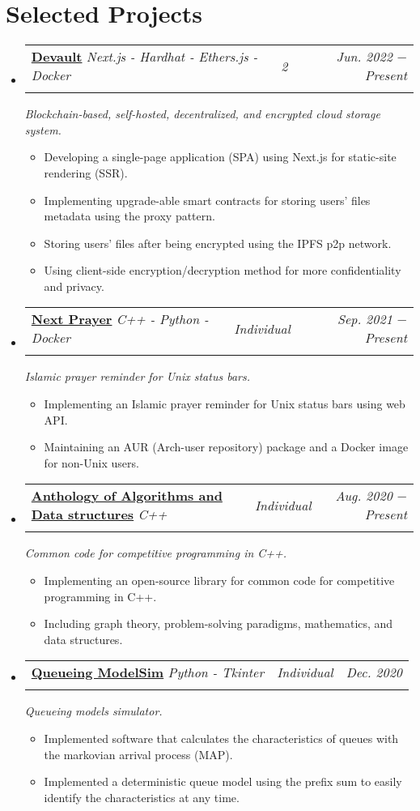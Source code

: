 \documentclass[letterpaper, 11pt]{article}
\makeatletter
\newcommand{\project}[7] {
  \vspace{-1pt}\item
  \begin{tabular*}{0.97\textwidth}[t]{ll@{\extracolsep{\fill}}r}
    #1 \href{#4}{\textbf{\color{RoyalBlue}#2}}
    \textbar{} \textit{\small#5} \textbar{ } & \textit{\footnotesize#7} & \textit{\small #3} \\
    \vspace{-10pt}
  \end{tabular*}
  \textit{\small #6}
  \vspace{-8pt}
}
\newcommand{\subproject}[1] {
\item\small
  {#1}
  \vspace{-2pt}
}
\makeatother
\begin{document}
\section{Selected Projects}
\begin{itemize}[leftmargin=*]
  \project
  {\faIcon{cloud}}
  {Devault}{Jun. 2022 $-$ Present}
  {https://devault.vercel.app/}{Next.js - Hardhat - Ethers.js - Docker}
  {Blockchain-based, self-hosted, decentralized, and encrypted cloud storage system.}{2}

  \begin{itemize}
    \subproject
    {Developing a single-page application (SPA) using Next.js for static-site rendering (SSR).}
    \subproject
    {Implementing upgrade-able smart contracts for storing users' files metadata using the proxy pattern.}
    \subproject
    {Storing users' files after being encrypted using the IPFS p2p network.}
    \subproject
    {Using client-side encryption/decryption method for more confidentiality and privacy.}
  \end{itemize}\vspace{-4pt}

  \project
  {\faIcon{mosque}}
  {Next Prayer}{Sep. 2021 $-$ Present}
  {https://github.com/AbdeltwabMF/nxprayer}{C++ - Python - Docker}
  {Islamic prayer reminder for Unix status bars.}{Individual}

  \begin{itemize}
    \subproject
    {Implementing an Islamic prayer reminder for Unix status bars using web API.}
    \subproject
    {Maintaining an AUR (Arch-user repository) package and a Docker image for non-Unix users.}
  \end{itemize}\vspace{-4pt}

  \project
  {\faIcon{laptop-code}}
  {Anthology of Algorithms and Data structures}{Aug. 2020 $-$ Present}
  {https://github.com/AbdeltwabMF/Anthology-of-Algorithms-and-Data-structures}{C++}
  {Common code for competitive programming in C++.}{Individual}

  \begin{itemize}
    \subproject
    {Implementing an open-source library for common code for competitive programming in C++.}
    \subproject
    {Including graph theory, problem-solving paradigms, mathematics, and data structures.}
  \end{itemize}\vspace{-4pt}

  \project
  {\faIcon{user-clock}}
  {Queueing ModelSim}{Dec. 2020}
  {https://github.com/AbdeltwabMF/Queueing-ModelSim}{Python - Tkinter}
  {Queueing models simulator.}{Individual}

  \begin{itemize}
    \subproject
    {Implemented software that calculates the characteristics of queues with the markovian arrival process (MAP).}
    \subproject
    {Implemented a deterministic queue model using the prefix sum to easily identify the characteristics at any time.}
  \end{itemize}\vspace{-4pt}
\end{itemize}
\end{document}
